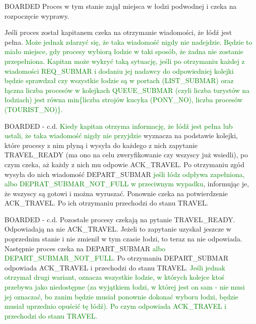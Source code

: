 \documentclass{beamer}
\begin{document}
\begin{frame}{BOARDED}
    \internallinenumbers
    \resetlinenumber[1]
    Proces w tym stanie zajął miejsca w łodzi podwodnej i czeka na rozpoczęcie wyprawy.

    \vspace{0.4cm}
    Jeśli proces został kapitanem czeka na otrzymanie wiadomości, że łódź jest pełna.
    \textcolor{green}{Może jednak zdarzyć się, że taka wiadomość nigdy nie nadejdzie. Będzie to miało miejsce, gdy procesy wybiorą łodzie w taki sposób, że żadna nie zostanie przepełniona. Kapitan może wykryć taką sytuację, jeśli po otrzymaniu każdej z wiadomości REQ\_SUBMAR i dodaniu jej nadawcy do odpowiedniej kolejki będzie sprawdzał czy wszystkie łodzie są w portach (LIST\_SUBMAR) oraz łączna liczba procesów w kolejkach QUEUE\_SUBMAR (czyli liczba turystów na łodziach) jest równa min\{liczba strojów kucyka (PONY\_NO), liczba procesów (TOURIST\_NO)\}.}
\end{frame}

\begin{frame}{BOARDED - c.d.}
    \internallinenumbers
    \resetlinenumber[1]
    \textcolor{green}{Kiedy kapitan otrzyma informację, że łódź jest pełna lub ustali, że taka wiadomość nigdy nie przyjdzie} wyznacza na podstawie kolejki, które procesy z nim płyną i wysyła do każdego z nich zapytanie TRAVEL\_READY (ma ono na celu zweryfikowanie czy wszyscy już wsiedli), po czym czeka, aż każdy z nich mu odpowie ACK\_TRAVEL. Po otrzymaniu zgód wysyła do nich wiadomość DEPART\_SUBMAR \textcolor{green}{jeśli łódz odpływa zapełniona, albo DEPRAT\_SUBMAR\_NOT\_FULL w przeciwnym wypadku}, informując je, że wszyscy są gotowi i można wyruszać. Ponownie czeka na potwierdzenie ACK\_TRAVEL. Po ich otrzymaniu przechodzi do stanu TRAVEL.
\end{frame}

\begin{frame}{BOARDED - c.d.}
    \internallinenumbers
    \resetlinenumber[1]
    Pozostałe procesy czekają na pytanie TRAVEL\_READY. Odpowiadają na nie ACK\_TRAVEL. Jeżeli to zapytanie uzyskał jeszcze w poprzednim stanie i nie zmienił w tym czasie łodzi, to teraz na nie odpowiada. \\
    Następnie proces czeka na DEPART\_SUBMAR \textcolor{green}{albo DEPART\_SUBMAR\_NOT\_FULL}. Po otrzymaniu DEPART\_SUBMAR odpowiada ACK\_TRAVEL i przechodzi do stanu TRAVEL. \textcolor{green}{Jeśli jednak otrzymał drugi wariant, oznacza wszystkie łodzie, w których kolejce ktoś przebywa jako niedostępne (za wyjątkiem łodzi, w której jest on sam - nie musi jej oznaczać, bo zanim będzie musiał ponownie dokonać wyboru łodzi, będzie musiał uprzednio opuścić tę łódź). Po czym odpowiada ACK\_TRAVEL i przechodzi do stanu TRAVEL.}
\end{frame}
\end{document}
